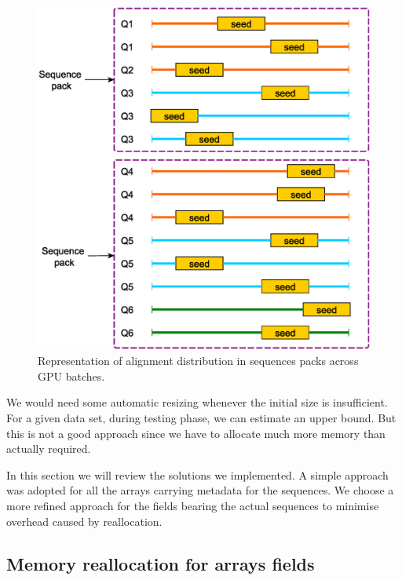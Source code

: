 \begin{figure}[h!]
	\centering
	\includegraphics[width=1\linewidth]{cpu-gpu-batches}
	\caption{Representation of alignment distribution in sequences packs across GPU batches.}
	\label{fig:cpu-gpu-batches}
\end{figure}


We would need some automatic resizing whenever the initial size is insufficient.
For a given data set, during testing phase, we can estimate an upper bound. But this is not a good approach since we have to allocate much more memory than actually required.

In this section we will review the solutions we implemented. A simple approach was adopted for all the arrays carrying metadata for the sequences. We choose a more refined approach for the fields bearing the actual sequences to minimise overhead caused by reallocation.

\subsection{Memory reallocation for arrays fields}

